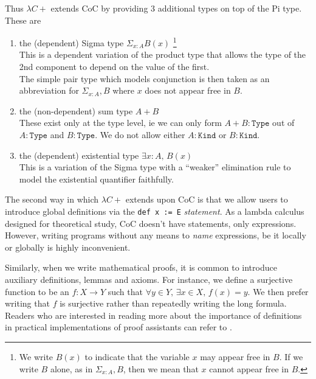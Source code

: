 \documentclass{article}
\begin{document}
Thus $\lambda C+$ extends CoC by providing 3 additional types on top of the
Pi type. These are
\begin{enumerate}
  \item the (dependent) Sigma type $\Sigma_{x : A} B(x)$ 
  \footnote{
    We write $B(x)$ to indicate that the variable $x$ may appear free in $B$.
    If we write $B$ alone, as in $\Sigma_{x : A}, B$, then we mean that $x$
    cannot appear free in $B$.
  }
    \\
    This is a dependent variation of the product type that allows the type 
    of the 2nd component to depend on the value of the first. \\
    The simple pair type which models conjunction is then taken as an
    abbreviation for $\Sigma_{x : A}, B$ where $x$ does not appear free in $B$.

  \item the (non-dependent) sum type $A + B$ \\
    These exist only at the type level, ie we can only form $A + B : \mathtt{Type}$ 
    out of $A : \mathtt{Type}$ and $B : \mathtt{Type}$.
    We do not allow either $A : \mathtt{Kind}$ or $B : \mathtt{Kind}$.

  \item the (dependent) existential type $\exists x : A, \, B(x)$ \\
    This is a variation of the Sigma type with a ``weaker'' elimination rule to
    model the existential quantifier faithfully.
\end{enumerate}

The second way in which $\lambda C+$ extends upon CoC is that we allow users to
introduce global definitions via the \verb|def x := E| \textit{statement}.
As a lambda calculus designed for theoretical study, CoC doesn't have statements,
only expressions.
However, writing programs without any means to \textit{name} expressions, be it
locally or globally is highly inconvenient.

Similarly, when we write mathematical proofs, it is common to introduce
auxiliary definitions, lemmas and axioms.
For instance, we define a surjective function to be an $f : X \to Y$ such that
$\forall y \in Y, \, \exists x \in X, \, f(x) = y$. We then prefer writing that
$f$ is surjective rather than repeatedly writing the long formula.
Readers who are interested in reading more about the importance of
definitions in practical implementations of proof assistants can refer to
\cite{type_theory_and_formal_proof}.
\end{document}
